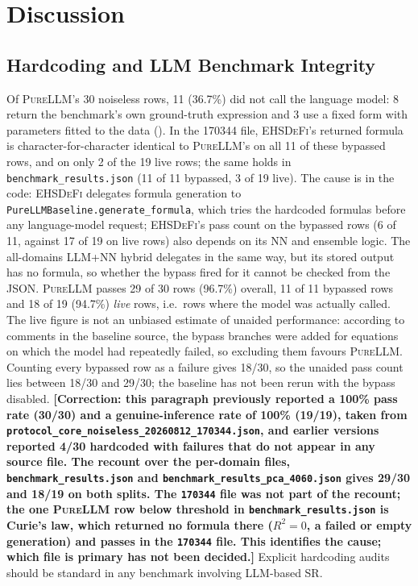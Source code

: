 \documentclass[twoside,11pt]{article}
\newcommand{\PureLLM}{\textsc{PureLLM}}
\newcommand{\EHD}{\textsc{EHSDeFi}}
\newcommand{\Rsq}{R^{2}}
\begin{document}
\section{Discussion}
\label{suppb:discussion}

\subsection{Hardcoding and LLM Benchmark Integrity}

Of \PureLLM{}'s 30 noiseless rows, 11 (36.7\%) did not call the language model: 8 return the benchmark's own
ground-truth expression and 3 use a fixed form with parameters fitted to the data
(). In the 170344 file, \EHD{}'s returned formula is character-for-character identical to \PureLLM{}'s on all 11 of these bypassed rows, and on only 2 of the 19 live rows; the same holds in \texttt{benchmark\_results.json} (11 of 11 bypassed, 3 of 19 live). The cause is in the code: \EHD{} delegates formula generation to \texttt{PureLLMBaseline.generate\_formula}, which tries the hardcoded formulas before any language-model request; \EHD{}'s pass count on the bypassed rows (6 of 11, against 17 of 19 on live rows) also depends on its NN and ensemble logic. The all-domains LLM+NN hybrid delegates in the same way, but its stored output has no formula, so whether the bypass fired for it cannot be checked from the JSON. \PureLLM{} passes 29 of 30 rows (96.7\%) overall, 11 of 11 bypassed rows and 18 of 19
(94.7\%) \emph{live} rows, i.e.\ rows where the model was actually called. The live figure is not an unbiased
estimate of unaided performance: according to comments in the baseline source, the bypass branches were added for
equations on which the model had repeatedly failed, so excluding them favours \PureLLM{}. Counting every bypassed
row as a failure gives 18/30, so the unaided pass count lies between 18/30 and 29/30; the baseline has not been rerun
with the bypass disabled.
\textbf{[Correction: this paragraph previously reported a 100\% pass rate (30/30) and a genuine-inference rate of
100\% (19/19), taken from \texttt{protocol\_core\_noiseless\_20260812\_170344.json}, and earlier versions reported
4/30 hardcoded with failures that do not appear in any source file. The recount over the per-domain files,
\texttt{benchmark\_results.json} and \texttt{benchmark\_results\_pca\_4060.json} gives 29/30 and 18/19 on both splits.
The \texttt{170344} file was not part of the recount; the one \PureLLM{} row below threshold in \texttt{benchmark\_results.json} is Curie's law, which returned no
formula there ($\Rsq=0$, a failed or empty generation) and passes in the \texttt{170344} file. This identifies the cause; which file
is primary has not been decided.]}
Explicit hardcoding audits should be standard in any
benchmark involving LLM-based SR.
\end{document}
